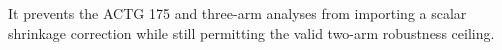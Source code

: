 It prevents the ACTG 175 and three-arm analyses from importing a scalar shrinkage correction while still permitting the valid two-arm robustness ceiling.